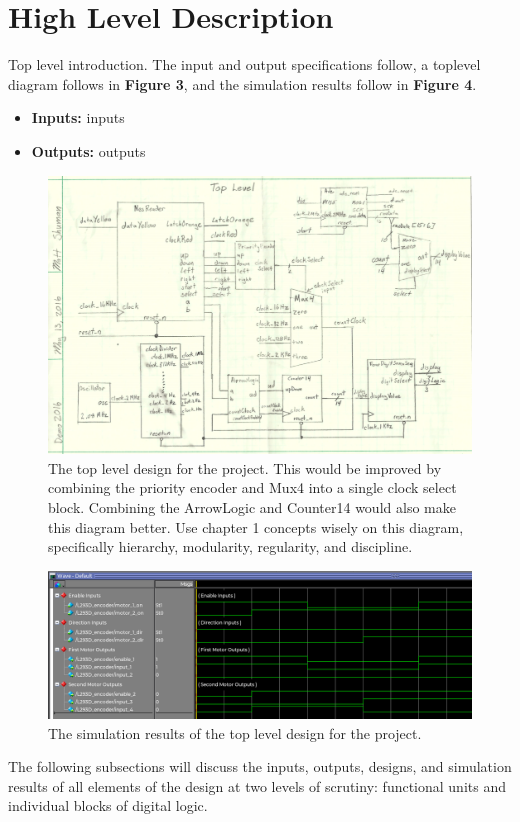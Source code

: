 \documentclass[a4paper]{article}
\begin{document}
\clearpage



\section{High Level Description}
Top level introduction. The input and output specifications follow, a toplevel diagram follows in \textbf{Figure 3}, and the simulation results follow in \textbf{Figure 4}.
\begin{itemize}
  \item \textbf{Inputs:  } inputs
  \item \textbf{Outputs: } outputs
\end{itemize}
\begin{figure}[h]
  \centering
    \includegraphics[width=.8\textwidth]{images/top_level.png}
	\caption{The top level design for the  project.  This would be improved by combining the priority encoder and Mux4 into a single clock select block.  Combining the ArrowLogic and Counter14 would also make this diagram better.  Use chapter 1 concepts wisely on this diagram, specifically hierarchy, modularity, regularity, and discipline.}
    \label{fig:top-level}
\end{figure}
\begin{figure}[h]
  \centering
    \includegraphics[width=.98\textwidth]{sims/top_level.png}
	\caption{The simulation results of the top level design for the  project.}
    \label{fig:top-level-sim}
\end{figure}
The following subsections will discuss the inputs, outputs, designs, and simulation results of all elements of the design at two levels of scrutiny: functional units and individual blocks of digital logic.
\end{document}
